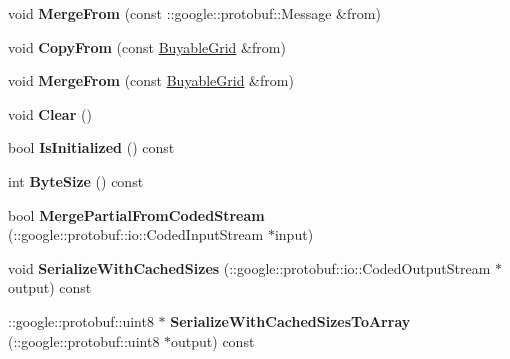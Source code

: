 \begin{DoxyCompactItemize}
\item 
\hypertarget{classmonopoly_1_1_buyable_grid_a3fae59b7ef01b0873e0e9d5be35c547a}{}void {\bfseries Merge\+From} (const \+::google\+::protobuf\+::\+Message \&from)\label{classmonopoly_1_1_buyable_grid_a3fae59b7ef01b0873e0e9d5be35c547a}

\item 
\hypertarget{classmonopoly_1_1_buyable_grid_aba430d9244b1b9a90e0aa0a94382e0cb}{}void {\bfseries Copy\+From} (const \hyperlink{classmonopoly_1_1_buyable_grid}{Buyable\+Grid} \&from)\label{classmonopoly_1_1_buyable_grid_aba430d9244b1b9a90e0aa0a94382e0cb}

\item 
\hypertarget{classmonopoly_1_1_buyable_grid_a55457ac6969b5de38c03b003b789f48a}{}void {\bfseries Merge\+From} (const \hyperlink{classmonopoly_1_1_buyable_grid}{Buyable\+Grid} \&from)\label{classmonopoly_1_1_buyable_grid_a55457ac6969b5de38c03b003b789f48a}

\item 
\hypertarget{classmonopoly_1_1_buyable_grid_af3d7cb252d13e4ed87fa7dbd1cc138ac}{}void {\bfseries Clear} ()\label{classmonopoly_1_1_buyable_grid_af3d7cb252d13e4ed87fa7dbd1cc138ac}

\item 
\hypertarget{classmonopoly_1_1_buyable_grid_a1f0906ead2e0f7f71e243ad31d00e3f6}{}bool {\bfseries Is\+Initialized} () const \label{classmonopoly_1_1_buyable_grid_a1f0906ead2e0f7f71e243ad31d00e3f6}

\item 
\hypertarget{classmonopoly_1_1_buyable_grid_ae4d665647958701ca2f2744a0e507942}{}int {\bfseries Byte\+Size} () const \label{classmonopoly_1_1_buyable_grid_ae4d665647958701ca2f2744a0e507942}

\item 
\hypertarget{classmonopoly_1_1_buyable_grid_ac1afd48d3d14bfabc322b68dd3063e5b}{}bool {\bfseries Merge\+Partial\+From\+Coded\+Stream} (\+::google\+::protobuf\+::io\+::\+Coded\+Input\+Stream $\ast$input)\label{classmonopoly_1_1_buyable_grid_ac1afd48d3d14bfabc322b68dd3063e5b}

\item 
\hypertarget{classmonopoly_1_1_buyable_grid_a79eb5ce206026d1775e64d1b635204c0}{}void {\bfseries Serialize\+With\+Cached\+Sizes} (\+::google\+::protobuf\+::io\+::\+Coded\+Output\+Stream $\ast$output) const \label{classmonopoly_1_1_buyable_grid_a79eb5ce206026d1775e64d1b635204c0}

\item 
\hypertarget{classmonopoly_1_1_buyable_grid_a9be36b8f05c7194ce2dbdebbce56ba99}{}\+::google\+::protobuf\+::uint8 $\ast$ {\bfseries Serialize\+With\+Cached\+Sizes\+To\+Array} (\+::google\+::protobuf\+::uint8 $\ast$output) const \label{classmonopoly_1_1_buyable_grid_a9be36b8f05c7194ce2dbdebbce56ba99}


\end{DoxyCompactItemize}
